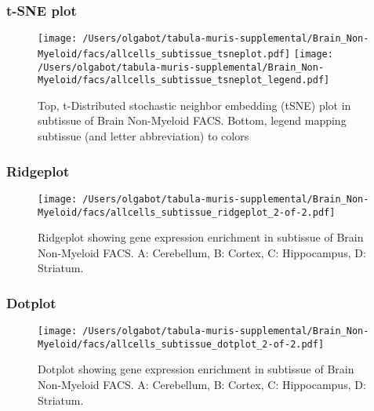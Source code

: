 \newpage
\subsubsection{t-SNE plot}
\begin{figure}[h]
\centering
\texttt{[image: /Users/olgabot/tabula-muris-supplemental/Brain\_Non-Myeloid/facs/allcells\_subtissue\_tsneplot.pdf]}
\texttt{[image: /Users/olgabot/tabula-muris-supplemental/Brain\_Non-Myeloid/facs/allcells\_subtissue\_tsneplot\_legend.pdf]}
\caption{Top, t-Distributed stochastic neighbor embedding (tSNE) plot  in subtissue of Brain Non-Myeloid FACS. Bottom, legend mapping subtissue (and letter abbreviation) to colors}
\end{figure}


\newpage
\newpage
\subsubsection{Ridgeplot}
\begin{figure}[h]
\centering
\texttt{[image: /Users/olgabot/tabula-muris-supplemental/Brain\_Non-Myeloid/facs/allcells\_subtissue\_ridgeplot\_2-of-2.pdf]}

\caption{ Ridgeplot  showing gene expression enrichment in subtissue of Brain Non-Myeloid FACS. A: Cerebellum, B: Cortex, C: Hippocampus, D: Striatum.}
\end{figure}


\newpage
\newpage
\subsubsection{Dotplot}
\begin{figure}[h]
\centering
\texttt{[image: /Users/olgabot/tabula-muris-supplemental/Brain\_Non-Myeloid/facs/allcells\_subtissue\_dotplot\_2-of-2.pdf]}

\caption{ Dotplot  showing gene expression enrichment in subtissue of Brain Non-Myeloid FACS. A: Cerebellum, B: Cortex, C: Hippocampus, D: Striatum.}
\end{figure}


